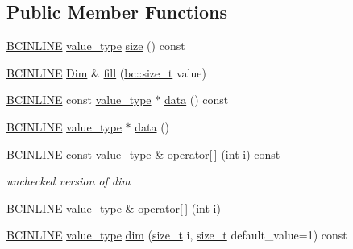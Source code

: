\subsection*{Public Member Functions}
\begin{DoxyCompactItemize}
\item 
\hyperlink{common_8h_a6699e8b0449da5c0fafb878e59c1d4b1}{B\+C\+I\+N\+L\+I\+NE} \hyperlink{structbc_1_1Dim_af59ff554825273cf6bd9619b2c78c196}{value\+\_\+type} \hyperlink{structbc_1_1Dim_ab7d16a8f97fa578782efd3ffe9390da4}{size} () const
\item 
\hyperlink{common_8h_a6699e8b0449da5c0fafb878e59c1d4b1}{B\+C\+I\+N\+L\+I\+NE} \hyperlink{structbc_1_1Dim}{Dim} \& \hyperlink{structbc_1_1Dim_ad93f3cc2e0ab0d1ee9554d203e89d9fa}{fill} (\hyperlink{namespacebc_aaf8e3fbf99b04b1b57c4f80c6f55d3c5}{bc\+::size\+\_\+t} value)
\item 
\hyperlink{common_8h_a6699e8b0449da5c0fafb878e59c1d4b1}{B\+C\+I\+N\+L\+I\+NE} const \hyperlink{structbc_1_1Dim_af59ff554825273cf6bd9619b2c78c196}{value\+\_\+type} $\ast$ \hyperlink{structbc_1_1Dim_ad0ddd6e6602ada9f8a5060cc0962b7dc}{data} () const
\item 
\hyperlink{common_8h_a6699e8b0449da5c0fafb878e59c1d4b1}{B\+C\+I\+N\+L\+I\+NE} \hyperlink{structbc_1_1Dim_af59ff554825273cf6bd9619b2c78c196}{value\+\_\+type} $\ast$ \hyperlink{structbc_1_1Dim_a45d1cefd214716eb389287d89209e584}{data} ()
\item 
\hyperlink{common_8h_a6699e8b0449da5c0fafb878e59c1d4b1}{B\+C\+I\+N\+L\+I\+NE} const \hyperlink{structbc_1_1Dim_af59ff554825273cf6bd9619b2c78c196}{value\+\_\+type} \& \hyperlink{structbc_1_1Dim_a2652546104d572e4dc15ad67034f3f96}{operator\mbox{[}$\,$\mbox{]}} (int i) const
\begin{DoxyCompactList}\small\item\em unchecked version of dim \end{DoxyCompactList}\item 
\hyperlink{common_8h_a6699e8b0449da5c0fafb878e59c1d4b1}{B\+C\+I\+N\+L\+I\+NE} \hyperlink{structbc_1_1Dim_af59ff554825273cf6bd9619b2c78c196}{value\+\_\+type} \& \hyperlink{structbc_1_1Dim_adbc11f0e5716ec016a452922afeb64a9}{operator\mbox{[}$\,$\mbox{]}} (int i)
\item 
\hyperlink{common_8h_a6699e8b0449da5c0fafb878e59c1d4b1}{B\+C\+I\+N\+L\+I\+NE} \hyperlink{structbc_1_1Dim_af59ff554825273cf6bd9619b2c78c196}{value\+\_\+type} \hyperlink{structbc_1_1Dim_adccb44583ec5a299e67b3f780dda7efc}{dim} (\hyperlink{structbc_1_1Dim_a8c7c7ae0cd96c3923e76097089747290}{size\+\_\+t} i, \hyperlink{structbc_1_1Dim_a8c7c7ae0cd96c3923e76097089747290}{size\+\_\+t} default\+\_\+value=1) const

\end{DoxyCompactItemize}
